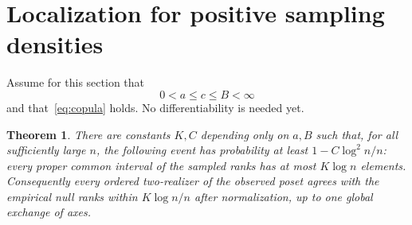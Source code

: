 \documentclass[11pt]{article}
\newtheorem{theorem}{Theorem}[section]
\theoremstyle{remark}
\numberwithin{equation}{section}
\begin{document}
\section{Localization for positive sampling densities}
Assume for this section that
\begin{equation}\label{eq:bounds}
 0<a\le c\le B<\infty
\end{equation}
and that~\eqref{eq:copula} holds. No differentiability is needed yet.

\begin{theorem}\label{thm:localize}
There are constants $K,C$ depending only on $a,B$ such that, for all
sufficiently large $n$, the following event has probability at least
$1-C\log^2n/n$:
every proper common interval of the sampled ranks has at most
$K\log n$ elements.
Consequently every ordered two-realizer of the observed poset agrees
with the empirical null ranks within $K\log n/n$ after normalization,
up to one global exchange of axes.
\end{theorem}
\end{document}
